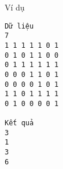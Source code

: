 Ví dụ
\begin{verbatim}
Dữ liệu
7
1 1 1 1 1 0 1
0 1 0 1 1 0 0
0 1 1 1 1 1 1
0 0 0 1 1 0 1
0 0 0 0 1 0 1
1 1 0 1 1 1 1
0 1 0 0 0 0 1

Kết quả
3
1
3
6
\end{verbatim}